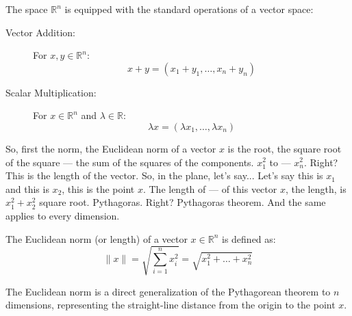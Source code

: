 \begin{math-stroke}
The space $\mathbb{R}^n$ is equipped with the standard operations of a vector space:
\begin{description}
    \item[Vector Addition:] For $x, y \in \mathbb{R}^n$:
    \[ x + y = (x_1 + y_1, \dots, x_n + y_n) \]
    \item[Scalar Multiplication:] For $x \in \mathbb{R}^n$ and $\lambda \in \mathbb{R}$:
    \[ \lambda x = (\lambda x_1, \dots, \lambda x_n) \]
\end{description}
\end{math-stroke}

\begin{spoken-clean}[00:21:18 - 00:22:37]
So, first the norm, the Euclidean norm of a vector $x$ is the root, the square root of the square --- the sum of the squares of the components. $x_1^2$ to --- $x_n^2$. Right?  This is the length of the vector. So, in the plane, let's say...  Let's say this is $x_1$ and this is $x_2$, this is the point $x$. The length of --- of this vector $x$, the length, is $x_1^2 + x_2^2$ square root. Pythagoras. Right? Pythagoras theorem. And the same applies to every dimension.
\end{spoken-clean}

\begin{math-stroke}
The Euclidean norm (or length) of a vector $x \in \mathbb{R}^n$ is defined as:
\[ \|x\| = \sqrt{\sum_{i=1}^n x_i^2} = \sqrt{x_1^2 + \dots + x_n^2} \]

\begin{center}
\end{center}

\begin{explanation-of-steps}
The Euclidean norm is a direct generalization of the Pythagorean theorem to $n$ dimensions, representing the straight-line distance from the origin to the point $x$.
\end{explanation-of-steps}
\end{math-stroke}

